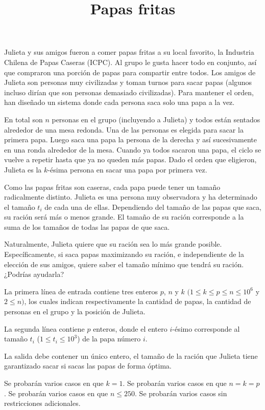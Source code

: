 \documentclass{oci}
\title{Papas fritas}
\begin{document}
\begin{problemDescription}
	Julieta y sus amigos fueron a comer papas fritas a su local favorito,
	la Industria Chilena de Papas Caseras (ICPC).
	Al grupo le gusta hacer todo en conjunto, así que compraron una porción
	de papas para compartir entre todos.
	Los amigos de Julieta son personas muy civilizadas y toman turnos para
	sacar papas (algunos incluso dirían que son personas demasiado civilizadas).
	Para mantener el orden, han diseñado un sistema donde cada
	persona saca solo una papa a la vez.

	En total son $n$ personas en el grupo (incluyendo a Julieta) y todos están
	sentados alrededor de una mesa redonda.
	Una de las personas es elegida para sacar la primera papa.
	Luego saca una papa la persona de la derecha y así sucesivamente en una
	ronda alrededor de la mesa.
	Cuando ya todos sacaron una papa, el ciclo se vuelve a repetir hasta que ya no
	queden más papas.
	Dado el orden que eligieron, Julieta es la $k$-ésima persona en sacar una papa
	por primera vez.

	Como las papas fritas son caseras, cada papa puede tener un tamaño radicalmente
	distinto.
	Julieta es una persona muy observadora y ha determinado el tamaño $t_i$ de cada una
	de ellas.
	Dependiendo del tamaño de las papas que saca, su ración será más o menos grande.
	El tamaño de su ración corresponde a la suma de los tamaños de todas
	las papas de que saca.

	Naturalmente, Julieta quiere que su ración sea lo más grande posible.
	Específicamente, si saca papas maximizando su ración, e independiente
	de la elección de sus amigos, quiere saber el tamaño mínimo que tendrá su ración.
	¿Podrías ayudarla?
\end{problemDescription}

\begin{inputDescription}
	La primera línea de entrada contiene tres enteros $p$, $n$ y $k$
	$(1 \leq k \leq p \leq n \leq 10^6$ y $2 \leq n)$, los cuales
	indican respectivamente la cantidad de papas, la cantidad de personas en el grupo
	y la posición de Julieta.

	La segunda línea contiene $p$ enteros, donde el entero $i$-ésimo
	corresponde al tamaño $t_i$ ($1 \leq t_i \leq 10^3$) de la papa número $i$.
\end{inputDescription}

\begin{outputDescription}
	La salida debe contener un único entero, el tamaño de la ración que Julieta tiene
	garantizado sacar si sacas las papas de forma óptima.
\end{outputDescription}

\begin{scoreDescription}
  	Se probarán varios casos en que $k = 1$.
 	Se probarán varios casos en que $n = k = p$.
  	Se probarán varios casos en que $n \leq 250$.
	Se probarán varios casos sin restricciones adicionales.
\end{scoreDescription}

\begin{sampleDescription}
\end{sampleDescription}
\end{document}
